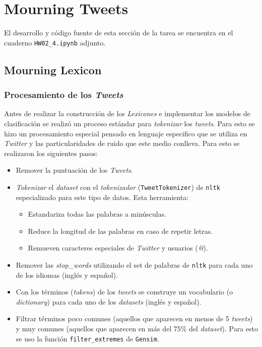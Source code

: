 \newpage
\section{Mourning Tweets}

El desarrollo y código fuente de esta sección de la tarea se encuentra en el cuaderno \texttt{HW02\_4.ipynb} adjunto.

\subsection{Mourning Lexicon}

\subsubsection{Procesamiento de los \textit{Tweets}}

Antes de realizar la construcción de los \textit{Lexicones} e implementar los modelos de clasificación se realizó un proceso estándar para \textit{tokenizar} los \textit{tweets}. Para esto se hizo un procesamiento especial pensado en lenguaje especifico que se utiliza en \textit{Twitter} y las particularidades de ruido que este medio conlleva. Para esto se realizaron los siguientes pasos:

\begin{itemize}
    \item Remover la puntuación de los \textit{Tweets}.
    
    \item \textit{Tokenizar} el \textit{dataset} con el \textit{tokenizador} (\texttt{TweetTokenizer}) de \texttt{nltk} especializado para este tipo de datos. Esta herramienta:
    \begin{itemize}
        \item Estandariza todas las palabras a minúsculas.
        
        \item Reduce la longitud de las palabras en caso de repetir letras.
        
        \item Remueven caracteres especiales de \textit{Twitter} y usuarios (\textit{@}).
    \end{itemize}
    
    \item Remover las \textit{stop\_words} utilizando el set de palabras de \texttt{nltk} para cada uno de los idiomas (inglés y español).
    
    \item Con los términos (\textit{tokens}) de los \textit{tweets} se construye un vocabulario (o \textit{dictionary}) para cada uno de los \textit{datasets} (inglés y español). 
    
    \item Filtrar términos poco comunes (aquellos que aparecen en menos de 5 \textit{tweets}) y muy comunes (aquellos que aparecen en más del 75\% del \textit{dataset}). Para esto se uso la función \texttt{filter\_extremes} de \texttt{Gensim}. 
    
\end{itemize}

